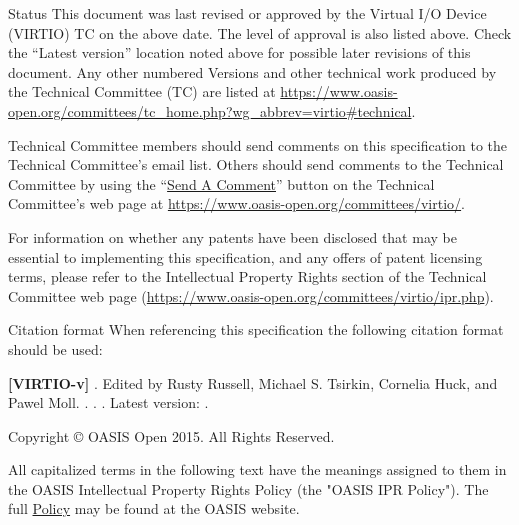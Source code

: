 \begin{titlepage}
\begin{oasistitlesection}{Status}
This document was last revised or approved by the Virtual I/O Device
(VIRTIO) TC on the above date. The level of approval is also listed above. Check the ``Latest version'' location noted above for possible later revisions of this document.
Any other numbered Versions and other
technical work produced by the Technical Committee (TC) are
listed at
\url{https://www.oasis-open.org/committees/tc_home.php?wg_abbrev=virtio#technical}.

Technical Committee members should send comments on this
specification to the Technical Committee’s email list. Others
should send comments to the Technical Committee by using the
``\href{https://www.oasis-open.org/committees/comments/form.php?wg_abbrev=virtio}{Send
A Comment}'' button on the Technical Committee’s web page at
\url{https://www.oasis-open.org/committees/virtio/}.

For information on whether any patents have been disclosed that
may be essential to implementing this specification, and any
offers of patent licensing terms, please refer to the
Intellectual Property Rights section of the Technical Committee
web page (\url{https://www.oasis-open.org/committees/virtio/ipr.php}).
\end{oasistitlesection}


\begin{oasistitlesection}{Citation format}
When referencing this specification the following citation format should be used:\newline

\textbf{[VIRTIO-v\virtiorev]}\newline
\textit{\virtioversion}. Edited by Rusty Russell, Michael S.
Tsirkin, Cornelia Huck, and Pawel Moll. \virtioworkingdraftdate.
\virtiodraftoasisstagename \virtiodraftstageextra . \virtiourlhtml .
Latest version: \virtiourllatesthtml .
\end{oasistitlesection}

\vfill\newpage


Copyright © OASIS Open 2015. All Rights Reserved.

All capitalized terms in the following text have the meanings assigned
to them in the OASIS Intellectual Property Rights Policy (the "OASIS
IPR Policy"). The full \href{https://www.oasis-open.org/policies-guidelines/ipr}{Policy} may be found at the OASIS website.


\end{titlepage}
